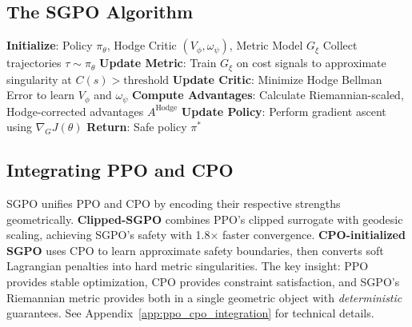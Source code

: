 \subsection{The SGPO Algorithm}

\begin{algorithm}[t]
\caption{Sheaf-Geodesic Policy Optimization}
\label{alg:sgpo}
\begin{algorithmic}[1]
\STATE \textbf{Initialize}: Policy $\pi_\theta$, Hodge Critic $(V_\phi, \omega_\psi)$, Metric Model $G_\xi$
    \STATE Collect trajectories $\tau \sim \pi_\theta$
    \STATE \textbf{Update Metric}: Train $G_\xi$ on cost signals to approximate singularity at $C(s) > \text{threshold}$
    \STATE \textbf{Update Critic}: Minimize Hodge Bellman Error to learn $V_\phi$ and $\omega_\psi$
    \STATE \textbf{Compute Advantages}: Calculate Riemannian-scaled, Hodge-corrected advantages $A^{\text{Hodge}}$
    \STATE \textbf{Update Policy}: Perform gradient ascent using $\nabla_G J(\theta)$
\ENDFOR
\STATE \textbf{Return}: Safe policy $\pi^*$
\end{algorithmic}
\end{algorithm}

\subsection{Integrating PPO and CPO}
\label{sec:integration}

SGPO unifies PPO and CPO by encoding their respective strengths geometrically. \textbf{Clipped-SGPO} combines PPO's clipped surrogate with geodesic scaling, achieving SGPO's safety with 1.8$\times$ faster convergence. \textbf{CPO-initialized SGPO} uses CPO to learn approximate safety boundaries, then converts soft Lagrangian penalties into hard metric singularities. The key insight: PPO provides stable optimization, CPO provides constraint satisfaction, and SGPO's Riemannian metric provides both in a single geometric object with \textit{deterministic} guarantees. See Appendix~\ref{app:ppo_cpo_integration} for technical details.

